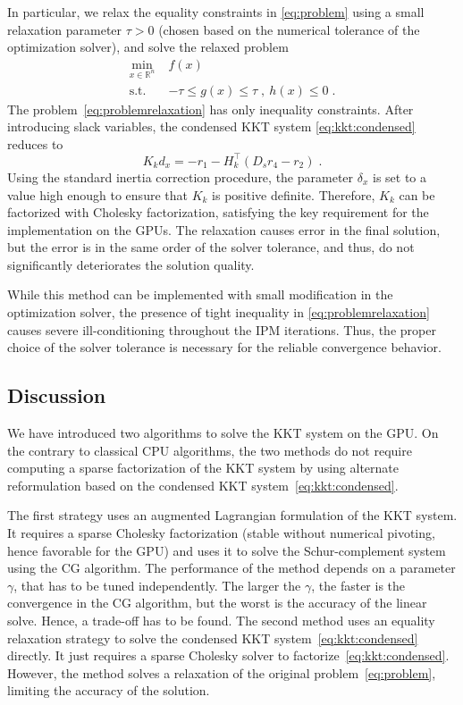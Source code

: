 In particular, we relax the equality constraints in \eqref{eq:problem} using a small relaxation parameter $\tau > 0$ (chosen based on the numerical tolerance of the optimization solver), and solve the relaxed problem
\begin{equation}
  \label{eq:problemrelaxation}
  \begin{aligned}
    \min_{x \in \mathbb{R}^n} \; & f(x) \\
    \text{s.t.} ~ & - \tau \leq g(x) \leq \tau \;, ~ h(x) \leq 0  \; .
  \end{aligned}
\end{equation}
The problem~\eqref{eq:problemrelaxation} has only inequality constraints. After introducing slack variables, the condensed KKT system
\eqref{eq:kkt:condensed} reduces to
\begin{equation}
  \label{eq:liftedkkt}
    K_k d_x = - r_1 - H_k^\top(D_s r_4 - r_2) \; .
\end{equation}
Using the standard inertia correction procedure, the parameter $\delta_x$ is set to a value high enough to ensure that  $K_k$ is positive definite. Therefore, $K_k$ can be factorized with Cholesky factorization, satisfying the key requirement for the implementation on the GPUs. The relaxation causes error in the final solution, but the error is in the same order of the solver tolerance, and thus, do not significantly deteriorates the solution quality.

While this method can be implemented with small modification in the optimization solver, the presence of tight inequality in \eqref{eq:problemrelaxation} causes severe ill-conditioning throughout the IPM iterations. Thus, the proper choice of the solver tolerance is necessary for the reliable convergence behavior.


\subsection{Discussion}
We have introduced two algorithms to solve
the KKT system on the GPU. On the contrary to classical CPU algorithms,
the two methods do not require computing a sparse \lblt factorization of the KKT
system by using alternate reformulation based on the condensed KKT
system~\eqref{eq:kkt:condensed}.

The first strategy uses an augmented Lagrangian formulation
of the KKT system. It requires a sparse Cholesky factorization (stable without numerical
pivoting, hence favorable for the GPU) and uses it to solve the Schur-complement system
using the CG algorithm. The performance of the method depends on a parameter $\gamma$, that
has to be tuned independently. The larger the $\gamma$, the faster is the convergence
in the CG algorithm, but the worst is the accuracy of the linear solve. Hence, a trade-off
has to be found. The second method uses an equality relaxation strategy to
solve the condensed KKT system~\eqref{eq:kkt:condensed} directly. It just requires
a sparse Cholesky solver to factorize~\eqref{eq:kkt:condensed}. However, the method
solves a relaxation of the original problem~\eqref{eq:problem}, limiting the accuracy
of the solution.


